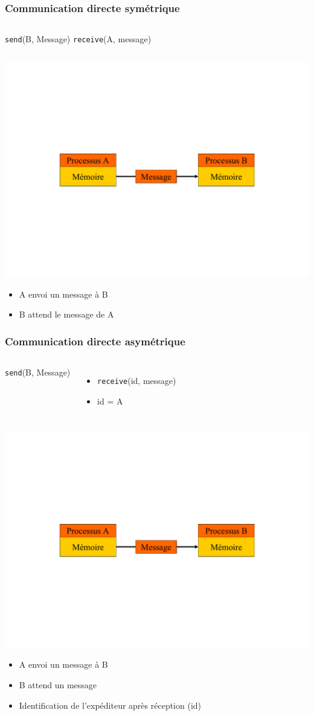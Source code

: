 \begin{frame}
\frametitle{Communication directe symétrique}
\begin{columns}
\texttt{send}(B, Message)
\texttt{receive}(A, message)
\end{columns}
\includegraphics[width=.9\textwidth]{../illustration/message_comm_directe.pdf}
\begin{itemize}
\item A envoi un message à B
\item B attend le message de A
\end{itemize}
\end{frame}

\begin{frame}
\frametitle{Communication directe asymétrique}
\begin{columns}
\texttt{send}(B, Message)
\begin{itemize}
\item \texttt{receive}(id, message)
\item id = A
\end{itemize}
\end{columns}
\includegraphics[width=.9\textwidth]{../illustration/message_comm_directe.pdf}
\begin{itemize}
\item A envoi un message à B
\item B attend un message
\item Identification de l’expéditeur après réception (id)
\end{itemize}
\end{frame}

